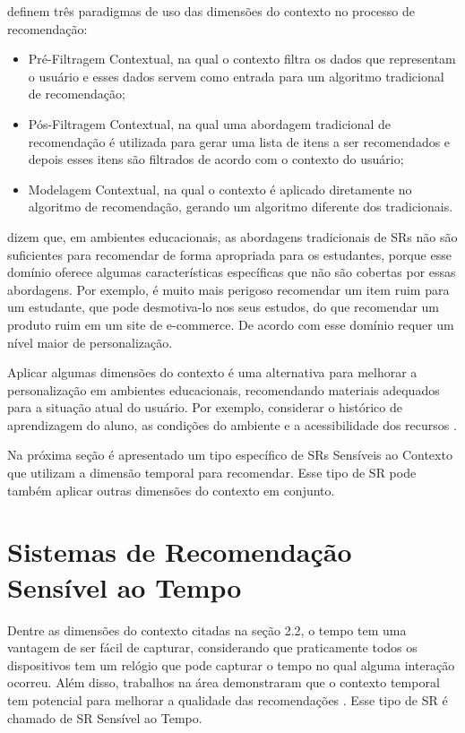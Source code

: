  definem três paradigmas de uso das dimensões do contexto no processo de recomendação:

\begin{itemize}
\item Pré-Filtragem Contextual, na qual o contexto filtra os dados que representam o usuário e esses dados servem
como entrada para um algoritmo tradicional de recomendação;
\item Pós-Filtragem Contextual, na qual uma abordagem tradicional de recomendação é utilizada para gerar uma lista de
itens a ser recomendados e depois esses itens são filtrados de acordo com o contexto do usuário;
\item Modelagem Contextual, na qual o contexto é aplicado diretamente no algoritmo de recomendação, gerando um
algoritmo diferente dos tradicionais.
\end{itemize}

 dizem que, em ambientes educacionais, as abordagens tradicionais de SRs não são
suficientes para recomendar de forma apropriada para os estudantes, porque esse domínio oferece algumas características
específicas que não são cobertas por essas abordagens. Por exemplo, é muito mais perigoso recomendar um item ruim para
um estudante, que pode desmotiva-lo nos seus estudos, do que recomendar um produto ruim em um site de e-commerce.
De acordo com  esse domínio requer um nível maior de personalização.

Aplicar algumas dimensões do contexto é uma alternativa para melhorar a personalização em ambientes educacionais,
recomendando materiais adequados para a situação atual do usuário. Por exemplo, considerar o histórico de aprendizagem
do aluno, as condições do ambiente e a acessibilidade dos recursos \cite{verbert2012context}.

Na próxima seção é apresentado um tipo específico de SRs Sensíveis ao Contexto que utilizam a dimensão temporal para
recomendar. Esse tipo de SR pode também aplicar outras dimensões do contexto em conjunto.

\section{Sistemas de Recomendação Sensível ao Tempo}

Dentre as dimensões do contexto citadas na seção 2.2, o tempo tem uma vantagem de ser fácil de capturar, considerando
que praticamente todos os dispositivos tem um relógio que pode capturar o tempo no qual alguma interação ocorreu.
Além disso, trabalhos na área demonstraram que o contexto temporal tem potencial para melhorar a qualidade das
recomendações \cite{campos2014time}. Esse tipo de SR é chamado de SR Sensível ao Tempo.

